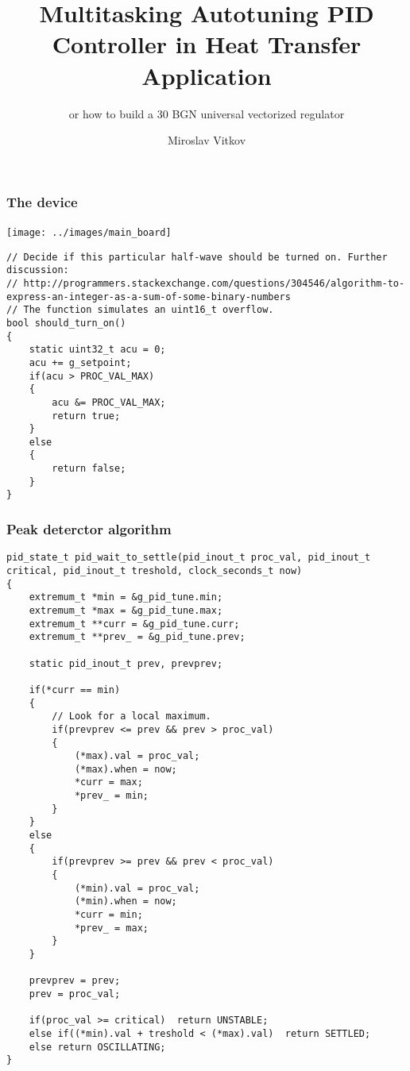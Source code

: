 \documentclass{beamer}
\title{Multitasking Autotuning PID Controller in Heat Transfer Application}
\subtitle{or how to build a 30 BGN universal vectorized regulator}
\author{Miroslav Vitkov}
\institute{ELDE, Technical University-Sofia}
\newlength\someheight
\begin{document}
\frame{\titlepage}


\begin{frame}
\frametitle{The device}
\texttt{[image: ../images/main\_board]}~
\end{frame}

\begin{frame}[fragile]
\begin{adjustbox}{width=\textwidth,height=\someheight,keepaspectratio}
\begin{lstlisting}
// Decide if this particular half-wave should be turned on. Further discussion:
// http://programmers.stackexchange.com/questions/304546/algorithm-to-express-an-integer-as-a-sum-of-some-binary-numbers
// The function simulates an uint16_t overflow.
bool should_turn_on()
{
    static uint32_t acu = 0;
    acu += g_setpoint;
    if(acu > PROC_VAL_MAX)
    {
        acu &= PROC_VAL_MAX;
        return true;
    }
    else
    {
        return false;
    }
}
\end{lstlisting}
\end{adjustbox}
\end{frame}

\begin{frame}[fragile]
\frametitle{Peak deterctor algorithm}
\begin{adjustbox}{width=\textwidth,height=\someheight,keepaspectratio}
\begin{lstlisting}
pid_state_t pid_wait_to_settle(pid_inout_t proc_val, pid_inout_t critical, pid_inout_t treshold, clock_seconds_t now)
{
    extremum_t *min = &g_pid_tune.min;
    extremum_t *max = &g_pid_tune.max;
    extremum_t **curr = &g_pid_tune.curr;
    extremum_t **prev_ = &g_pid_tune.prev;

    static pid_inout_t prev, prevprev;

    if(*curr == min)
    {
        // Look for a local maximum.
        if(prevprev <= prev && prev > proc_val)
        {
            (*max).val = proc_val;
            (*max).when = now;
            *curr = max;
            *prev_ = min;
        }
    }
    else
    {
        if(prevprev >= prev && prev < proc_val)
        {
            (*min).val = proc_val;
            (*min).when = now;
            *curr = min;
            *prev_ = max;
        }
    }

    prevprev = prev;
    prev = proc_val;

    if(proc_val >= critical)  return UNSTABLE;
    else if((*min).val + treshold < (*max).val)  return SETTLED;
    else return OSCILLATING;
}
\end{lstlisting}
\end{adjustbox}
\end{frame}
\end{document}
